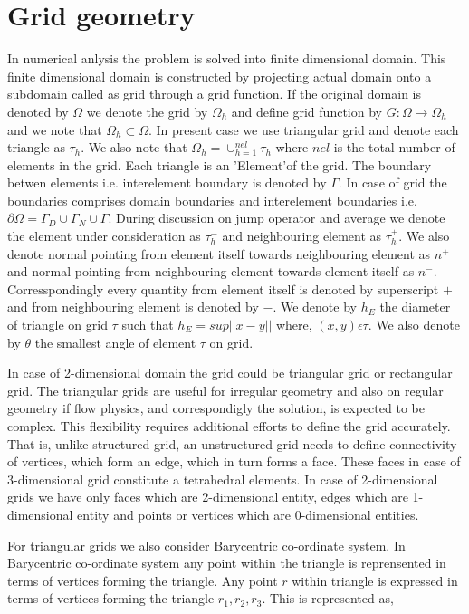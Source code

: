 \documentclass[a4paper,12pt]{book}
\begin{document}
\section{Grid geometry}

In numerical anlysis the problem is solved into finite dimensional domain. This finite dimensional domain is constructed by projecting actual domain onto a subdomain called as grid through a grid function.
If the original domain is denoted by $\Omega$ we denote the grid by $\Omega_h$ and define grid function by $G:\Omega \rightarrow \Omega_h$ and we note that $\Omega_h \subset \Omega$. In present case we use triangular grid and denote each triangle as $\tau_h$. We also note that $\Omega_h = \cup_{h=1}^{nel} \tau_h$ where $nel$ is the total number of elements in the grid. Each triangle is an 'Element'of the grid. The boundary betwen elements i.e. interelement boundary is denoted by $\Gamma$. In case of grid the boundaries comprises domain boundaries and interelement boundaries i.e. $\partial \Omega = \Gamma_D \cup \Gamma_N \cup \Gamma$. During discussion on jump operator and average we denote the element under consideration as $\tau_{h}^-$ and neighbouring element as $\tau_{h}^+$. We also denote normal pointing from element itself towards neighbouring element as $n^+$ and normal pointing from neighbouring element towards element itself as $n^-$. Corresspondingly every quantity from element itself is denoted by superscript $+$ and from neighbouring element is denoted by $-$.  We denote by $h_E$ the diameter of triangle on grid $\tau$ such that $h_E = sup||x-y||$ where, $(x,y) \epsilon \tau$. We also denote by $\theta$ the smallest angle of element $\tau$ on grid.

In case of 2-dimensional domain the grid could be triangular grid or rectangular grid. The triangular grids are useful for irregular geometry and also on regular geometry if flow physics, and correspondigly the solution, is expected to be complex. This flexibility requires additional efforts to define the grid accurately. That is, unlike structured grid, an unstructured grid needs to define connectivity of vertices, which form an edge, which in turn forms a face. These faces in case of 3-dimensional grid constitute a tetrahedral elements. In case of 2-dimensional grids we have only faces which are 2-dimensional entity, edges which are 1-dimensional entity and points or vertices which are 0-dimensional entities.

For triangular grids we also consider Barycentric co-ordinate system. In Barycentric co-ordinate system any point within the triangle is reprensented in terms of vertices forming the triangle. Any point $r$ within triangle is expressed in terms of vertices forming the triangle $r_1,r_2,r_3$. This is represented as,
\end{document}
